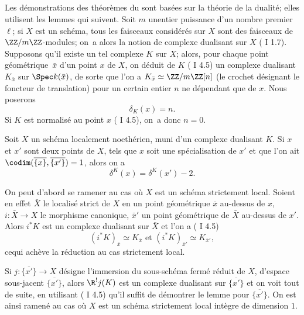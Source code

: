 \subsection{} \label{XIV.2.3}
Les d\'emonstrations des th\'eor\`emes du \numero {} sont bas\'ees sur la th\'eorie de la dualit\'e; elles utilisent les lemmes qui suivent. Soit $m$ un\pageoriginale entier puissance d'un nombre premier $\ell$; si $X$ est un sch\'ema, tous les faisceaux consid\'er\'es sur $X$ sont des faisceaux de $\ZZ/m\ZZ$-modules; on~a alors la notion de complexe dualisant sur $X$ ( I 1.7). Supposons qu'il existe un tel complexe $K$ sur $X$; alors, pour chaque point g\'eom\'etrique~$\bar x$  d'un point $x$ de $X$, on d\'eduit de $K$ (\cf {} I 4.5) un complexe dualisant~$K_{\bar x}$ sur $\Spec k(\bar x)$, de sorte que l'on a $K_{\bar x}\simeq\ZZ/m\ZZ[n]$ (le crochet d\'esignant le foncteur de translation) pour un certain entier $n$ ne d\'ependant que de $x$. Nous poserons
$$
\delta_K(x)=n.
$$
Si $K$ est normalis\'e au point $x$ ( I 4.5), on~a donc $n=0$.

\begin{sublemme} \label{XIV.2.3.1} Soit $X$ un sch\'ema localement noeth\'erien, muni d'un complexe dualisant $K$. Si $x$ et $x'$ sont deux points de $X$, tels que $x$ soit une sp\'ecialisation de $x'$ et que l'on ait $\codim(\overline{\{x\}}, \overline{\{x'\}})=1$, alors on a
$$
\delta^K(x)=\delta^{K}(x')-2.
$$
\end{sublemme}

On peut d'abord se ramener au cas o\`u $X$ est un sch\'ema strictement local. Soient en effet $\bar X$ le localis\'e strict de $X$ en un point g\'eom\'etrique $\bar x$ au-dessus de $x$, $i:\bar X\to X$ le morphisme canonique, $\bar x'$ un point g\'eom\'etrique de $\bar X$ au-dessus de $x'$. Alors $i^*K$ est un complexe dualisant sur $\bar X$ et l'on a ( I 4.5)
$$
(i^*K)_{\bar x}\simeq K_{\bar x}\text{ et } (i^*K)_{\bar x'}\simeq K_{\bar x'},
$$
ce\pageoriginale qui ach\`eve la r\'eduction au cas strictement local.

Si $j:\overline{\{x'\}}\to X$ d\'esigne l'immersion du sous-sch\'ema ferm\'e r\'eduit de $X$, d'espace sous-jacent $\overline{\{x'\}}$, alors $\R^!j(K)$ est un complexe dualisant sur $\overline{\{x'\}}$ et on voit tout de suite, en utilisant ( I 4.5) qu'il suffit de d\'emontrer le lemme pour $\overline{\{x'\}}$. On est ainsi ramen\'e au cas o\`u $X$ est un sch\'ema strictement local int\`egre de dimension $1$.

